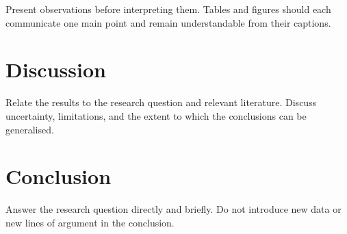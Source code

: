 \documentclass[masters,nl,book,11pt,redheadings]{OU}
\begin{document}
Present observations before interpreting them.
Tables and figures should each communicate one main point and remain understandable from their captions.

\lipsum[45-60]

\chapter{Discussion}

Relate the results to the research question and relevant literature.
Discuss uncertainty, limitations, and the extent to which the conclusions can be generalised.

\lipsum[61-76]

\chapter{Conclusion}

Answer the research question directly and briefly.
Do not introduce new data or new lines of argument in the conclusion.

\lipsum[77-90]

\end{document}
